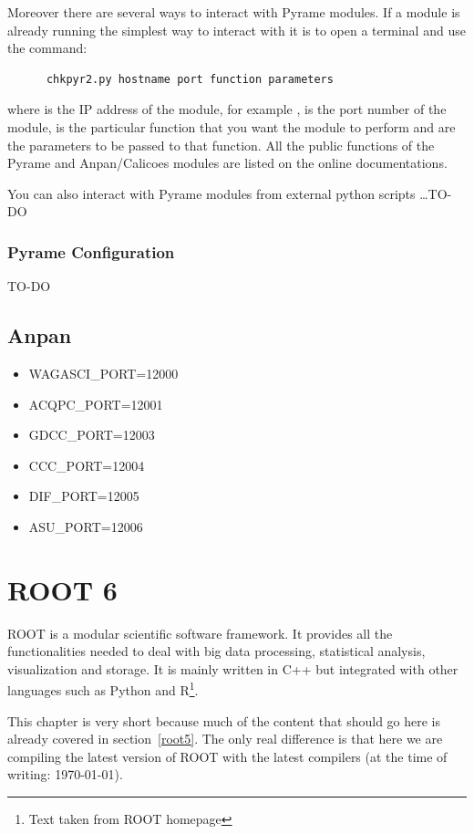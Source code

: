 Moreover there are several ways to interact with Pyrame modules. If a
module is already running the simplest way to interact with it is to
open a terminal and use the command:
\begin{lstlisting}
      chkpyr2.py hostname port function parameters
\end{lstlisting}
where  is the IP address of the module, for
example ,  is the port number
of the module,  is the particular function that
you want the module to perform and  are the
parameters to be passed to that function. All the public functions of
the Pyrame and Anpan/Calicoes modules are listed on the online
documentations.

You can also interact with Pyrame modules from external python scripts
\dots TO-DO

\subsection{Pyrame Configuration}\label{sec:pyrame-configuration}

TO-DO


\section{Anpan}
\begin{itemize}
\item WAGASCI\_PORT=12000
\item ACQPC\_PORT=12001
\item GDCC\_PORT=12003
\item CCC\_PORT=12004
\item DIF\_PORT=12005
\item ASU\_PORT=12006
\end{itemize}

\chapter{ROOT 6}
ROOT is a modular scientific software framework. It provides all the
functionalities needed to deal with big data processing, statistical
analysis, visualization and storage. It is mainly written in C++ but
integrated with other languages such as Python and R\footnote{Text
  taken from ROOT homepage}.

This chapter is very short because much of the content that should go
here is already covered in section~\ref{root5}. The only real
difference is that here we are compiling the latest version of ROOT with
the latest compilers (at the time of writing: \today).

